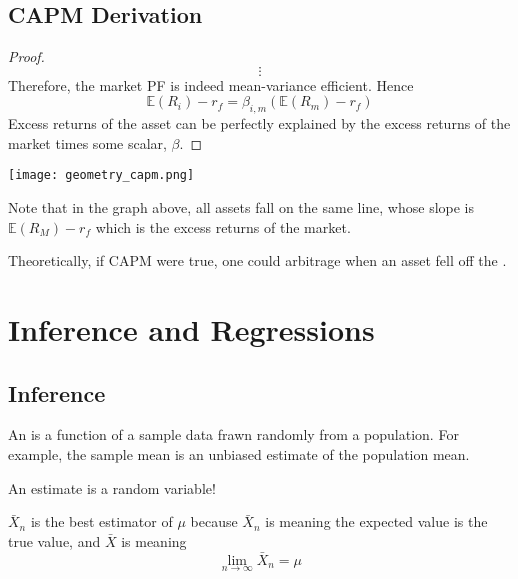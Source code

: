 \documentclass[12pt]{scrartcl}
\newcommand{\E}{\mathbb{E}}
\begin{document}
\subsection{CAPM Derivation}

\begin{proof}
  
  \[\vdots\]
  Therefore, the market PF is indeed mean-variance efficient. Hence 
  \[\E(R_i) - r_f = \beta_{i, m} (\E(R_m) - r_f)\]
  Excess returns of the asset can be perfectly explained by the excess 
  returns of the market times some scalar, $\beta$. 
\end{proof}

\texttt{[image: geometry\_capm.png]}

\begin{note}
  Note that in the  graph above, all assets fall on the same line, whose slope 
  is $\E(R_M) - r_f$ which is the excess returns of the market.
\end{note}

\begin{note}
  Theoretically, if CAPM were true, one could arbitrage when an asset fell off the .
\end{note}

\section{Inference and Regressions}

\subsection{Inference}

\begin{definition}
  An  is a function of a sample data frawn randomly from a population.
  For example, the sample mean is an unbiased estimate of the population mean.
\end{definition}

\begin{note}
  An estimate is a random variable!
\end{note}

\begin{definition}
  $\bar{X}_n$ is the best estimator of $\mu$ because $\bar{X}_n$ is  meaning 
  the expected value is the true value, and $\bar{X}$ is  meaning 
  \[\lim_{n\to\infty} \bar{X}_n = \mu\]
\end{definition}
\end{document}
